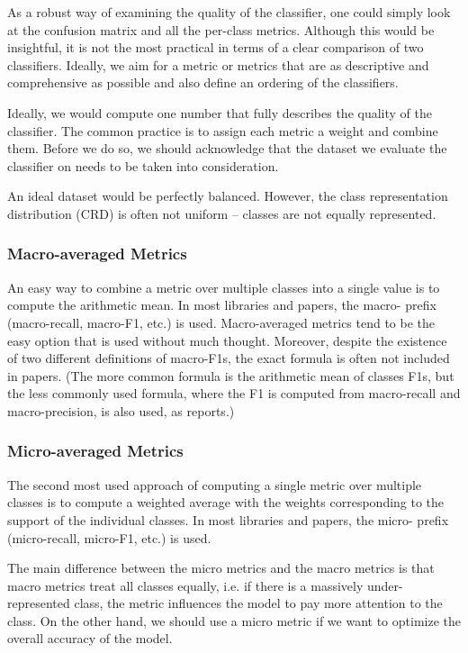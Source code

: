 As a robust way of examining the quality of the classifier, one could simply look at the confusion matrix and all the per-class metrics. Although this would be insightful, it is not the most practical in terms of a clear comparison of two classifiers. Ideally, we aim for a metric or metrics that are as descriptive and comprehensive as possible and also define an ordering of the classifiers.

Ideally, we would compute one number that fully describes the quality of the classifier. The common practice is to assign each metric a weight and combine them. Before we do so, we should acknowledge that the dataset we evaluate the classifier on needs to be taken into consideration.

An ideal dataset would be perfectly balanced. However,
the class representation distribution (CRD) is often not uniform -- classes are not equally represented.


\subsubsection{Macro-averaged Metrics}

An easy way to combine a metric over multiple classes into a single value is to compute the arithmetic mean. In most libraries and papers, the macro- prefix (macro-recall, macro-F1, etc.) is used.  Macro-averaged metrics tend to be the easy option that is used without much thought. Moreover, despite the existence of two different definitions of macro-F1s, the exact formula is often not included in papers. (The more common formula is the arithmetic mean of classes F1s, but the less commonly used formula, where the F1 is computed from macro-recall and macro-precision, is also used, as \citep{Opitz2019MacroFA} reports.)

\subsubsection{Micro-averaged Metrics}
The second most used approach of computing a single metric over multiple classes is to compute a weighted average with the weights corresponding to the support of the individual classes. In most libraries and papers, the micro- prefix (micro-recall, micro-F1, etc.) is used. 

The main difference between the micro metrics and the macro metrics is that macro metrics treat all classes equally, i.e. if there is a massively under-represented class, the metric influences the model to pay more attention to the class. On the other hand, we should use a micro metric if we want to optimize the overall accuracy of the model.

